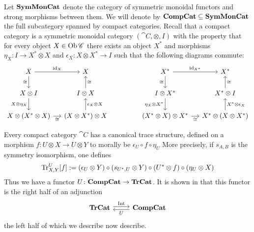 \documentclass[12pt,oneside,article,draft]{memoir}
\begin{document}
Let $\mathbf{SymMonCat}$ denote the category of symmetric monoidal functors and strong morphisms between them. We will denote by $\mathbf{CompCat}\subseteq\mathbf{SymMonCat}$ the full subcategory spanned by compact categories. Recall that a compact category is a symmetric monoidal category $(\cat{C},\otimes,I)$ with the property that for every object $X\in\operatorname{Ob}\mathscr{C}$ there exists an object $X^*$ and morphisms $\eta_X\colon I\to X^*\otimes X$ and $\epsilon_X\colon X\otimes X^*\to I$ such that the following diagrams commute:
$$\begin{tikzcd}[column sep=small]
X\arrow[r,"\id_X"]\arrow[d,"\cong"']&X\\
X\otimes I\arrow[d,"X\otimes\eta_X"']&I\otimes X\arrow[u,"\cong"']\\
X\otimes(X^*\otimes X)\arrow[r,"\cong"']&(X\otimes X^*)\otimes X\arrow[u,"\epsilon_X\otimes X"']
\end{tikzcd}
\hspace{.6in}
\begin{tikzcd}[column sep=small]
X^*\arrow[r,"\id_{X^*}"]\arrow[d,"\cong"']&X^*\\
I\otimes X^*\arrow[d,"\eta_X\otimes X^*"']&X^*\otimes I\arrow[u,"\cong"']\\
(X^*\otimes X)\otimes X^*\arrow[r,"\cong"']&X^*\otimes (X\otimes X^*)\arrow[u,"X^*\otimes\epsilon_X"']
\end{tikzcd}
$$

Every compact category $\cat{C}$ has a canonical trace structure, defined on a morphism $f\colon U\otimes X\to U\otimes Y$ to morally be $\epsilon_U\circ f\circ \eta_U$ More precisely, if $s_{A,B}$ is the symmetry isomorphism, one defines
$$\operatorname{Tr}^U_{X,Y}[f]:=(\epsilon_U\otimes Y)\circ (s_{U^*,U}\otimes Y)\circ (U^*\otimes f)\circ (\eta_U\otimes X)$$
Thus we have a functor 
$U\colon\mathbf{CompCat}\to\mathbf{TrCat}$. It is shown in \cite{Joyal-Street-Verity} that this functor is the right half of an adjunction 
\begin{equation}\label{dia:traced compact adjunction}
\begin{tikzcd}
\TrCat\arrow[r,shift left=.5ex, "\Int"]&\CompCat\arrow[l,shift left=.5ex,"U"]
\end{tikzcd}
\end{equation}
the left half of which we describe now describe. 
\end{document}
